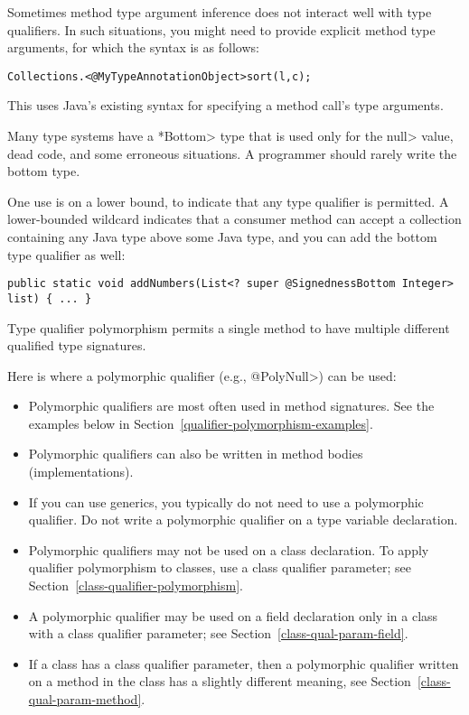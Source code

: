 
Sometimes method type argument inference does not interact well with
type qualifiers. In such situations, you might need to provide
explicit method type arguments, for which the syntax is as follows:

\begin{alltt}
    Collections.<@MyTypeAnnotation Object>sort(l, c);
\end{alltt}

\noindent
This uses Java's existing syntax for specifying a method call's type arguments.



Many type systems have a \<*Bottom> type that is used only for the \<null>
value, dead code, and some erroneous situations.  A programmer should
rarely write the bottom type.

One use is on a lower bound, to indicate that any type qualifier is
permitted.  A lower-bounded wildcard indicates that a consumer method can
accept a collection containing any Java type above some Java type, and you
can add the bottom type qualifier as well:

\begin{Verbatim}
public static void addNumbers(List<? super @SignednessBottom Integer> list) { ... }
\end{Verbatim}



Type qualifier polymorphism permits a single method to have multiple different qualified
type signatures.

Here is where a polymorphic qualifier (e.g., \<@PolyNull>) can be used:
\begin{itemize}
\item Polymorphic qualifiers are most often used in method signatures.
  See the examples below in Section~\ref{qualifier-polymorphism-examples}.
\item Polymorphic qualifiers can also be written in method bodies
  (implementations).
\item If you can use generics, you typically do not need to use a
  polymorphic qualifier.  Do not write a polymorphic qualifier on a type
  variable declaration.
\item Polymorphic qualifiers may not be used on a class declaration.
  To apply qualifier polymorphism to classes, use a class qualifier
  parameter; see Section~\ref{class-qualifier-polymorphism}.
\item A polymorphic qualifier may be used on a field declaration only in a
  class with a class qualifier parameter; see Section~\ref{class-qual-param-field}.
\item If a class has a class qualifier parameter, then a polymorphic
  qualifier written on a method in the class has a slightly different
  meaning, see Section~\ref{class-qual-param-method}.
\end{itemize}

